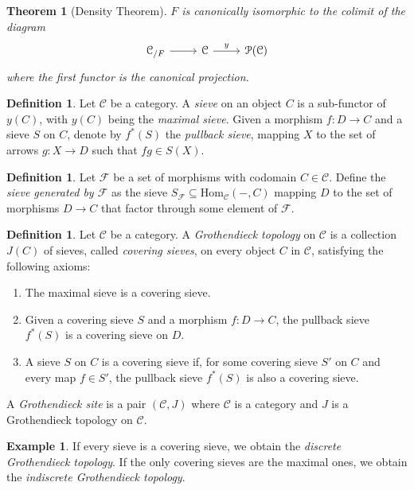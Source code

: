 \documentclass[a4paper]{book}
\newcommand{\lC}{\mathcal{C}}
\newcommand{\lF}{\mathcal{F}}
\newcommand{\lP}{\mathcal{P}}
\renewcommand{\hom}{\mathrm{Hom}} %
\newtheorem{theorem}[equation]{Theorem}
\theoremstyle{definition}
\newtheorem{definition}[equation]{Definition}
\newtheorem{example}[equation]{Example}
\theoremstyle{remark}
\numberwithin{equation}{section}
\begin{document}
	\begin{theorem}[Density Theorem]\label{thm:density}
		$F$ is canonically isomorphic to the colimit of the diagram \begin{equation}
			\begin{tikzcd}
				\lC_{/F} \arrow[r] & \lC \arrow[r,"y"] & \lP(\lC)
			\end{tikzcd}
		\end{equation}where the first functor is the canonical projection.
	\end{theorem}
	\begin{definition}
		Let $\lC$ be a category. A \emph{sieve} on an object $C$ is a sub-functor of $y(C)$, with $y(C)$ being the \textit{maximal sieve}. Given a morphism $f\colon D\to C$ and a sieve $S$ on $C$, denote by $f^*(S)$ the \textit{pullback sieve}, mapping $X$ to the set of arrows $g\colon X\to D$ such that $fg\in S(X)$. 
	\end{definition}
	\begin{definition}\label{def:generatedsieve}
		Let ${\lF}$ be a set of morphisms with codomain $C\in\lC$. Define the \emph{sieve generated by $\lF$} as the sieve $S_\lF\subseteq\hom_\lC(-,C)$ mapping $D$ to the set of morphisms $D\to C$ that factor through some element of $\lF$. 
	\end{definition}
	\begin{definition}
		Let $\lC$ be a category. A \emph{Grothendieck topology} on $\lC$ is a collection $J(C)$ of sieves, called \textit{covering sieves}, on every object $C$ in $\lC$, satisfying the following axioms:
		\begin{enumerate}
			\item The maximal sieve is a covering sieve.
			\item Given a covering sieve $S$ and a morphism $f\colon D \to C$, the pullback sieve $f^*(S)$ is a covering sieve on $D$.
			\item A sieve $S$ on $C$ is a covering sieve if, for some covering sieve $S'$ on $C$ and every map $f\in S'$, the pullback sieve $f^*(S)$ is also a covering sieve. 
		\end{enumerate}
		A \emph{Grothendieck site} is a pair $(\lC, J)$ where $\lC$ is a category and $J$ is a Grothendieck topology on $\lC$.
	\end{definition}
	\begin{example}If every sieve is a covering sieve, we obtain the \emph{discrete Grothendieck topology}. If the only covering sieves are the maximal ones, we obtain the \textit{indiscrete Grothendieck topology}.
	\end{example}
\end{document}

